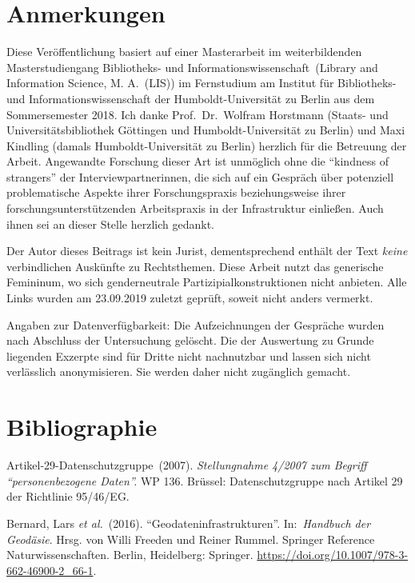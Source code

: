 \documentclass[a4paper,
fontsize=11pt,
oneside,
numbers=noperiodatend,
parskip=half-,
bibliography=totoc,
final
]{scrartcl}
\begin{document}
\hypertarget{anmerkungen}{%
\section{Anmerkungen}\label{anmerkungen}}

Diese Veröffentlichung basiert auf einer Masterarbeit im weiterbildenden
Masterstudiengang Bibliotheks- und Informationswissenschaft~(Library and
Information Science, M. A.~(LIS)) im Fernstudium am Institut für
Bibliotheks- und Informationswissenschaft der Humboldt-Uni\-ver\-si\-tät zu
Berlin aus dem Sommersemester 2018. Ich danke Prof.~Dr.~Wolfram
Horstmann (Staats- und Universitätsbibliothek Göttingen und
Humboldt-Universität zu Berlin) und Maxi Kindling (damals
Humboldt-Universität zu Berlin) herzlich für die Betreuung der Arbeit.
Angewandte Forschung dieser Art ist unmöglich ohne die \enquote{kindness
of strangers} der Interviewpartnerinnen, die sich auf ein Gespräch über
potenziell problematische Aspekte ihrer Forschungspraxis beziehungsweise
ihrer forschungsunterstützenden Arbeitspraxis in der Infrastruktur
einließen. Auch ihnen sei an dieser Stelle herzlich gedankt.

Der Autor dieses Beitrags ist kein Jurist, dementsprechend enthält der
Text \emph{keine} verbindlichen Auskünfte zu Rechtsthemen. Diese Arbeit
nutzt das generische Femininum, wo sich genderneutrale
Partizipialkonstruktionen nicht anbieten. Alle Links wurden am
23.09.2019 zuletzt geprüft, soweit nicht anders vermerkt.

Angaben zur Datenverfügbarkeit: Die Aufzeichnungen der Gespräche wurden
nach Abschluss der Untersuchung gelöscht. Die der Auswertung zu Grunde
liegenden Exzerpte sind für Dritte nicht nachnutzbar und lassen sich
nicht verlässlich anonymisieren. Sie werden daher nicht zugänglich
gemacht.

\hypertarget{bibliographie}{%
\section{Bibliographie}\label{bibliographie}}

Artikel-29-Datenschutzgruppe~(2007). \emph{Stellungnahme 4/2007 zum
Begriff \enquote{personenbezogene Daten}.} WP 136. Brüssel:
Datenschutzgruppe nach Artikel 29 der Richtlinie 95/46/EG.

Bernard, Lars \emph{et al.}~(2016). \enquote{Geodateninfrastrukturen}.
In:~\emph{Handbuch der Geodäsie}. Hrsg. von Willi Freeden und Reiner
Rummel. Springer Reference Naturwissenschaften. Berlin, Heidelberg:
Springer. \url{https://doi.org/10.1007/978-3-662-46900-2_66-1}.
\end{document}
